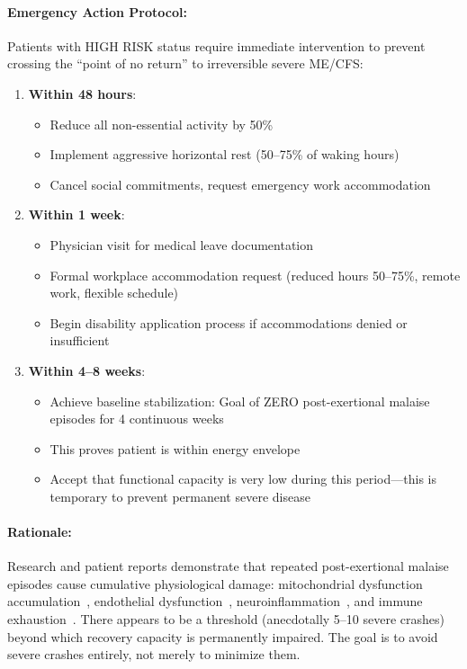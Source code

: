 \begin{warning}
\paragraph{Emergency Action Protocol:}
Patients with HIGH RISK status require immediate intervention to prevent crossing the ``point of no return'' to irreversible severe ME/CFS:

\begin{enumerate}
    \item \textbf{Within 48 hours}:
    \begin{itemize}
        \item Reduce all non-essential activity by 50\%
        \item Implement aggressive horizontal rest (50--75\% of waking hours)
        \item Cancel social commitments, request emergency work accommodation
    \end{itemize}

    \item \textbf{Within 1 week}:
    \begin{itemize}
        \item Physician visit for medical leave documentation
        \item Formal workplace accommodation request (reduced hours 50--75\%, remote work, flexible schedule)
        \item Begin disability application process if accommodations denied or insufficient
    \end{itemize}

    \item \textbf{Within 4--8 weeks}:
    \begin{itemize}
        \item Achieve baseline stabilization: Goal of ZERO post-exertional malaise episodes for 4 continuous weeks
        \item This proves patient is within energy envelope
        \item Accept that functional capacity is very low during this period---this is temporary to prevent permanent severe disease
    \end{itemize}
\end{enumerate}

\paragraph{Rationale:}
Research and patient reports demonstrate that repeated post-exertional malaise episodes cause cumulative physiological damage: mitochondrial dysfunction accumulation~\cite{wang2023wasf3,Syed2025}, endothelial dysfunction~\cite{heng2025mecfs}, neuroinflammation~\cite{Nakatomi2014neuroinflammation}, and immune exhaustion~\cite{iu2024tcell_exhaustion}. There appears to be a threshold (anecdotally 5--10 severe crashes) beyond which recovery capacity is permanently impaired. The goal is to avoid severe crashes entirely, not merely to minimize them.
\end{warning}

